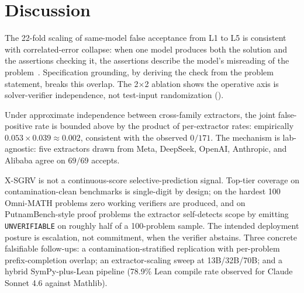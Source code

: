 \documentclass{article}
\begin{document}
\begin{table}[t]
\centering
\caption{\textbf{X-SGRV versus open PRMs at matched coverage.}}
\label{tab:prm}
\end{table}

\section{Discussion}

The 22-fold scaling of same-model false acceptance from L1 to L5 is consistent with correlated-error collapse: when one model produces both the solution and the assertions checking it, the assertions describe the model's misreading of the problem~\citep{kim2025correlated}. Specification grounding, by deriving the check from the problem statement, breaks this overlap. The 2$\times$2 ablation shows the operative axis is solver-verifier independence, not test-input randomization ().

Under approximate independence between cross-family extractors, the joint false-positive rate is bounded above by the product of per-extractor rates: empirically $0.053 \times 0.039 \approx 0.002$, consistent with the observed $0/171$. The mechanism is lab-agnostic: five extractors drawn from Meta, DeepSeek, OpenAI, Anthropic, and Alibaba agree on $69/69$ accepts.

X-SGRV is not a continuous-score selective-prediction signal. Top-tier coverage on contamination-clean benchmarks is single-digit by design; on the hardest 100 Omni-MATH problems zero working verifiers are produced, and on PutnamBench-style proof problems the extractor self-detects scope by emitting \texttt{UNVERIFIABLE} on roughly half of a 100-problem sample. The intended deployment posture is escalation, not commitment, when the verifier abstains. Three concrete falsifiable follow-ups: a contamination-stratified replication with per-problem prefix-completion overlap; an extractor-scaling sweep at 13B/32B/70B; and a hybrid SymPy-plus-Lean pipeline (78.9\% Lean compile rate observed for Claude Sonnet 4.6 against Mathlib).
\end{document}
